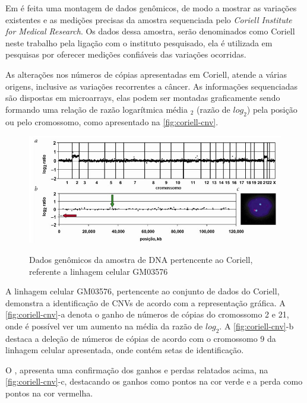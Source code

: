 Em \cite{Snijders2001} é feita uma montagem de dados genômicos, de modo a mostrar as variações existentes e as medições precisas da amostra sequenciada pelo \textit{Coriell Institute for Medical Research}. Os dados dessa amostra, serão denominados como Coriell neste trabalho pela ligação com o instituto pesquisado, ela é utilizada em pesquisas por oferecer medições confiáveis das variações ocorridas.

As alterações nos números de cópias apresentadas em Coriell, atende a várias origens, inclusive as variações recorrentes a câncer. As informações sequenciadas são dispostas em microarrays, elas podem ser montadas graficamente sendo formando uma relação de razão logarítmica média $_2$ (razão de $log_{2}$) pela posição ou pelo cromossomo, como apresentado na \autoref{fig:coriell-cnv}.

\begin{figure}[!htb]
    \centering
    \caption{Dados genômicos da amostra de DNA pertencente ao Coriell, referente a linhagem celular GM03576}
    \includegraphics[width=1\textwidth]{./dados/figuras/coriell-cnv}
    \label{fig:coriell-cnv}
\end{figure}

A linhagem celular GM03576, pertencente ao conjunto de dados do Coriell, demonstra a identificação de CNVs de acordo com a representação gráfica. A \autoref{fig:coriell-cnv}-a denota o ganho de números de cópias do cromossomo 2 e 21, onde é possível ver um aumento na média da razão de $log_{2}$. A \autoref{fig:coriell-cnv}-b destaca a deleção de números de cópias de acordo com o cromossomo 9 da linhagem celular apresentada, onde contém setas de identificação.

O \cite{Snijders2001}, apresenta uma confirmação dos ganhos e perdas relatados acima, na \autoref{fig:coriell-cnv}-c, destacando os ganhos como pontos na cor verde e a perda como pontos na cor vermelha.

